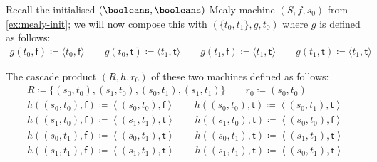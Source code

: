 \begin{example}\label{ex:mealy-cascade}
    Recall the initialised \((\booleans,\booleans)\)-Mealy machine
    \((S, f, s_0)\) from \cref{ex:mealy-init}; we will now compose this with
    \((\{t_0,t_1\},g,t_0)\) where \(g\) is defined as follows:
    \begin{gather*}
        g(t_0, \mathsf{f}) \coloneqq \langle{t_0,\mathsf{f}}\rangle
        \qquad
        g(t_0, \mathsf{t}) \coloneqq \langle{t_1,\mathsf{t}}\rangle
        \qquad
        g(t_1, \mathsf{f}) \coloneqq \langle{t_1,\mathsf{t}}\rangle
        \qquad
        g(t_1, \mathsf{t}) \coloneqq \langle{t_1,\mathsf{t}}\rangle
    \end{gather*}
    \begin{center}
        
    \end{center}
    The cascade product \((R, h, r_0)\) of these two machines defined as
    follows:
    \begin{gather*}
        R \coloneqq \{(s_0,t_0), (s_1,t_0), (s_0,t_1), (s_1,t_1)\}
        \qquad
        r_0 \coloneqq (s_0,t_0)
        \\
        h((s_0, t_0), \mathsf{f})
        \coloneqq
        \left\langle(s_0, t_0), \mathsf{f}\right\rangle
        \qquad
        h((s_0, t_0), \mathsf{t})
        \coloneqq
        \left\langle(s_0, t_1), \mathsf{t}\right\rangle
        \\
        h((s_1, t_0), \mathsf{f})
        \coloneqq
        \left\langle(s_1, t_1), \mathsf{t}\right\rangle
        \qquad
        h((s_1, t_0), \mathsf{t})
        \coloneqq
        \left\langle(s_0, t_0), \mathsf{f}\right\rangle
        \\
        h((s_0, t_1), \mathsf{f})
        \coloneqq
        \left\langle(s_0, t_1), \mathsf{t}\right\rangle
        \qquad
        h((s_0, t_1), \mathsf{t})
        \coloneqq
        \left\langle(s_1, t_1), \mathsf{t}\right\rangle
        \\
        h((s_1, t_1), \mathsf{f})
        \coloneqq
        \left\langle(s_1, t_1), \mathsf{t}\right\rangle
        \qquad
        h((s_1, t_1), \mathsf{t})
        \coloneqq
        \left\langle(s_0, t_1), \mathsf{t}\right\rangle
    \end{gather*}
    \begin{center}
        
    \end{center}
\end{example}

